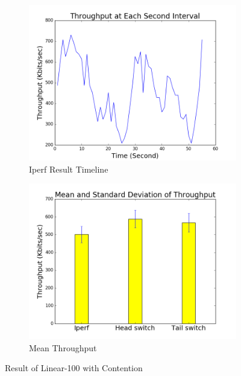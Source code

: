 \documentclass[12pt]{article}
\begin{document}
\begin{figure}
\centering
\begin{subfigure}{.5\textwidth}
  \centering
  \includegraphics[width=.9\linewidth]{544_data/544_linear_100_double/timeline.png}
  \caption{Iperf Result Timeline}
  \label{fig:third_a}
\end{subfigure}%
\begin{subfigure}{.5\textwidth}
  \centering
  \includegraphics[width=.9\linewidth]{544_data/544_linear_100_double/bar.png}
  \caption{Mean Throughput}
  \label{fig:third_b}
\end{subfigure}
\caption{Result of Linear-100 with Contention}
\label{fig:third}
\end{figure}
\end{document}
